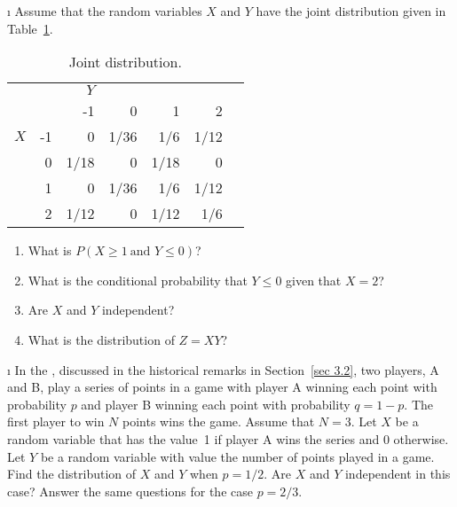 \begin{LJSItem}
\i\label{exer 5.1.10} Assume that the random variables $X$ and $Y$ have the joint distribution
given in Table~\ref{table 4.5}.
\begin{table}
\centering
\begin{tabular}{lr|rrrrr} 
     &     &  $Y$  &       &        &        \\
     &     &   -1  &  0    &  1     &  2     \\ \hline
$X$  & -1  &   0   & 1/36  &  1/6   & 1/12   \\
     &  0  & 1/18  &  0    &  1/18  &  0     \\
     &  1  &   0   & 1/36  &  1/6   & 1/12   \\
     &  2  & 1/12  &  0    &  1/12  & 1/6    \\
\end{tabular}
\caption{Joint distribution.}
\label{table 4.5}
\end{table}

\begin{enumerate}
\item What is $P(X \geq 1\ \mbox {and\ } Y \leq 0)$?

\item What is the conditional probability that $Y \leq 0$ given that $X = 2$?

\item Are $X$ and $Y$ independent?

\item What is the distribution of $Z = XY$?
\end{enumerate}

\i\label{exer 5.1.11} In the , discussed in 
the historical remarks in Section~\ref{sec 3.2}, two players, A and B, play a series of points in a
game with player A winning each point with probability $p$ and player B winning each point with
probability
$q = 1 - p$.  The first player to win $N$ points wins the game.  Assume that $N = 3$.  Let $X$
be a random variable that has the value~1 if player A wins the series and 0 otherwise.  Let
$Y$ be a random variable with value the number of points played in a game.  Find the
distribution of $X$ and $Y$ when $p = 1/2$.  Are $X$ and $Y$ independent in this case?  Answer
the same questions for the case $p = 2/3$.


\end{LJSItem}
